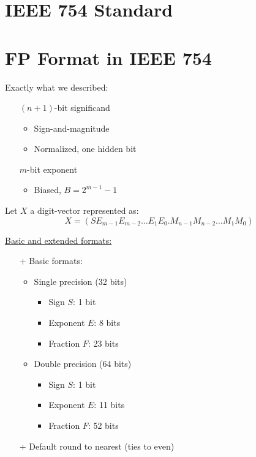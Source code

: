 \documentclass[12pt,openany, tikz,border=10pt]{book}
\begin{document}
			      	
			      	\newpage 
			      	\section{IEEE 754 Standard}
			      	\section*{FP Format in IEEE 754}
			      	
			      	Exactly what we described:
			      	\begin{itemize}
			      		\item[] \( (n + 1) \)-bit significand
			      		      \begin{itemize}
			      		      	\item Sign-and-magnitude
			      		      	\item Normalized, one hidden bit
			      		      \end{itemize}
			      		\item[] \( m \)-bit exponent
			      		      \begin{itemize}
			      		      	\item Biased, \( B = 2^{m-1} - 1 \)
			      		      \end{itemize}
			      	\end{itemize}
			      	
			      	Let \( X \) a digit-vector represented as:
			      	\[ X = (S E_{m-1} E_{m-2} \ldots E_1 E_0 . M_{n-1} M_{n-2} \ldots M_1 M_0) \]
			      	
			      	\underline{Basic and extended formats:}
			      	\begin{itemize}
			      		\item[+] Basic formats:
			      		      \begin{itemize}
			      		      	\item Single precision (32 bits)
			      		      	      \begin{itemize}
			      		      	      	\item Sign \( S \): 1 bit
			      		      	      	\item Exponent \( E \): 8 bits
			      		      	      	\item Fraction \( F \): 23 bits
			      		      	      \end{itemize}
			      		      	\item Double precision (64 bits)
			      		      	      \begin{itemize}
			      		      	      	\item Sign \( S \): 1 bit
			      		      	      	\item Exponent \( E \): 11 bits
			      		      	      	\item Fraction \( F \): 52 bits
			      		      	      \end{itemize}
			      		      \end{itemize}
			      		\item[+] Default round to nearest (ties to even)
			      	\end{itemize}
			      	
\end{document}
